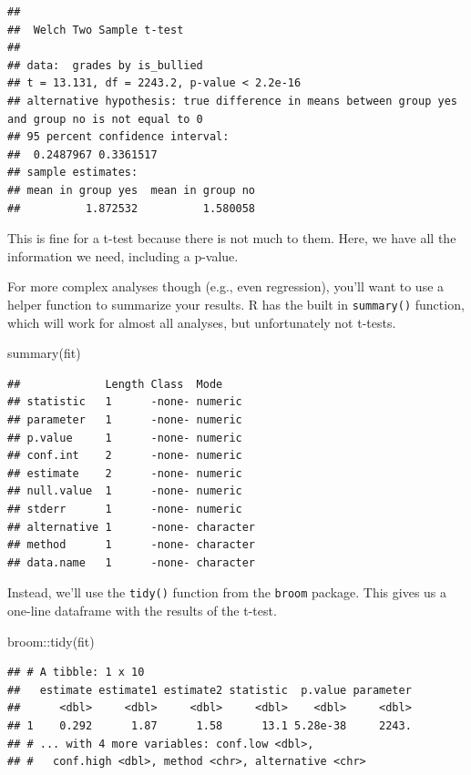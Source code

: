 \documentclass[
]{book}
\newenvironment{Shaded}{\begin{snugshade}}{\end{snugshade}}
\newcommand{\FunctionTok}[1]{\textcolor[rgb]{0.00,0.00,0.00}{#1}}
\newcommand{\NormalTok}[1]{#1}
\newcommand{\SpecialCharTok}[1]{\textcolor[rgb]{0.00,0.00,0.00}{#1}}
\begin{document}
\begin{verbatim}
## 
##  Welch Two Sample t-test
## 
## data:  grades by is_bullied
## t = 13.131, df = 2243.2, p-value < 2.2e-16
## alternative hypothesis: true difference in means between group yes and group no is not equal to 0
## 95 percent confidence interval:
##  0.2487967 0.3361517
## sample estimates:
## mean in group yes  mean in group no 
##          1.872532          1.580058
\end{verbatim}

This is fine for a t-test because there is not much to them. Here, we have all the information we need, including a p-value.

For more complex analyses though (e.g., even regression), you'll want to use a helper function to summarize your results. R has the built in \texttt{summary()} function, which will work for almost all analyses, but unfortunately not t-tests.

\begin{Shaded}
\begin{Highlighting}[]
\FunctionTok{summary}\NormalTok{(fit)}
\end{Highlighting}
\end{Shaded}

\begin{verbatim}
##             Length Class  Mode     
## statistic   1      -none- numeric  
## parameter   1      -none- numeric  
## p.value     1      -none- numeric  
## conf.int    2      -none- numeric  
## estimate    2      -none- numeric  
## null.value  1      -none- numeric  
## stderr      1      -none- numeric  
## alternative 1      -none- character
## method      1      -none- character
## data.name   1      -none- character
\end{verbatim}

Instead, we'll use the \texttt{tidy()} function from the \texttt{broom} package. This gives us a one-line dataframe with the results of the t-test.

\begin{Shaded}
\begin{Highlighting}[]
\NormalTok{broom}\SpecialCharTok{::}\FunctionTok{tidy}\NormalTok{(fit)}
\end{Highlighting}
\end{Shaded}

\begin{verbatim}
## # A tibble: 1 x 10
##   estimate estimate1 estimate2 statistic  p.value parameter
##      <dbl>     <dbl>     <dbl>     <dbl>    <dbl>     <dbl>
## 1    0.292      1.87      1.58      13.1 5.28e-38     2243.
## # ... with 4 more variables: conf.low <dbl>,
## #   conf.high <dbl>, method <chr>, alternative <chr>
\end{verbatim}
\end{document}
